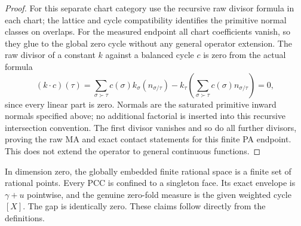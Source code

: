\documentclass[11pt]{article}
\begin{document}
\begin{proof}
For this separate chart category use the recursive raw divisor formula in each chart; the lattice and cycle compatibility identifies the primitive normal classes on overlaps. For the measured endpoint all chart coefficients vanish, so they glue to the global zero cycle without any general operator extension. The raw divisor of a constant $k$ against a balanced cycle $c$ is zero from the actual formula
\begin{equation}\label{raw}
 (k\cdot c)(\tau)=\sum_{\sigma\succ\tau}c(\sigma)k_\sigma(n_{\sigma/\tau})
 -k_\tau\left(\sum_{\sigma\succ\tau}c(\sigma)n_{\sigma/\tau}\right)=0,
\end{equation}
since every linear part is zero. Normals are the saturated primitive inward normals specified above; no additional factorial is inserted into this recursive intersection convention. The first divisor vanishes and so do all further divisors, proving the raw MA and exact contact statements for this finite PA endpoint. This does not extend the operator to general continuous functions.
\end{proof}

In dimension zero, the globally embedded finite rational space is a finite set of rational points. Every PCC is confined to a singleton face. Its exact envelope is $\gamma+u$ pointwise, and the genuine zero-fold measure is the given weighted cycle $[X]$. The gap is identically zero. These claims follow directly from the definitions.
\end{document}
